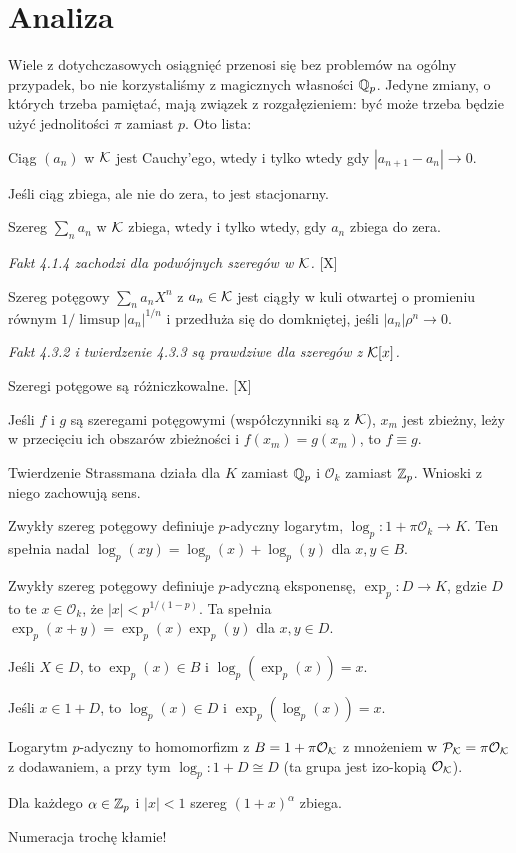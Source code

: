 \section{Analiza}
Wiele z dotychczasowych osiągnięć przenosi się bez problemów na ogólny przypadek, bo nie korzystaliśmy z magicznych własności $\mathbb Q_p$.
Jedyne zmiany, o których trzeba pamiętać, mają związek z rozgałęzieniem: być może trzeba będzie użyć jednolitości $\pi$ zamiast $p$. Oto lista:
\begin{enumx}
	\item Ciąg $(a_n)$ w $\mathcal K$ jest Cauchy'ego, wtedy i tylko wtedy gdy $|a_{n+1} - a_n| \to 0$.
	\item Jeśli ciąg zbiega, ale nie do zera, to jest stacjonarny.
	\item Szereg $\sum_n a_n$ w $\mathcal K$ zbiega, wtedy i tylko wtedy, gdy $a_n$ zbiega do zera.
	\item \emph{\color{black}Fakt 4.1.4 zachodzi dla podwójnych szeregów w $\mathcal K$.} [X]
	\item Szereg potęgowy $\sum_n  a_n X^n$ z $a_n \in \mathcal K$ jest ciągły w kuli otwartej o promieniu równym $1/\limsup |a_n|^{1/n}$ i przedłuża się do domkniętej, jeśli $|a_n| \rho^n \to 0$.
	\item \emph{\color{black} Fakt 4.3.2 i twierdzenie 4.3.3 są prawdziwe dla szeregów z $\mathcal K[x]$.}
	\item Szeregi potęgowe są różniczkowalne. [X]
	\item Jeśli $f$ i $g$ są szeregami potęgowymi (współczynniki są z $\mathcal K$), $x_m$ jest zbieżny, leży w przecięciu ich obszarów zbieżności i $f(x_m) = g(x_m)$, to $f \equiv g$.
	\item Twierdzenie Strassmana działa dla $K$ zamiast $\mathbb Q_p$ i $\mathcal O_k$ zamiast $\mathbb Z_p$.
	Wnioski z niego zachowują sens.
	\item Zwykły szereg potęgowy definiuje $p$-adyczny logarytm, $\log_p \colon 1 + \pi \mathcal O_k \to K$.
	Ten spełnia nadal $\log_p(xy) = \log_p(x) + \log_p(y)$ dla $x, y \in B$.
	\item Zwykły szereg potęgowy definiuje $p$-adyczną eksponensę, $\exp_p \colon D \to K$, gdzie $D$ to te $x \in \mathcal O_k$, że $|x| < p^{1/(1-p)}$.
	Ta spełnia $\exp_p(x+y) = \exp_p(x) \exp_p(y)$ dla $x, y \in D$.
	\item Jeśli $X \in D$, to $\exp_p(x) \in B$ i $\log_p(\exp_p(x)) = x$.
	\item Jeśli $x \in 1+D$, to $\log_p(x) \in D$ i $\exp_p(\log_p(x)) = x$.
	\item Logarytm $p$-adyczny to homomorfizm z $B=1+\pi \mathcal O_\mathcal K$ z mnożeniem w $\mathcal P_\mathcal K = \pi \mathcal O_\mathcal K$ z dodawaniem, a przy tym $\log_p \colon 1 + D \cong D$ (ta grupa jest izo-kopią $\mathcal O_{\mathcal K}$).
	\item Dla każdego $\alpha \in \mathbb Z_p$ i $|x| < 1$ szereg $(1+x)^\alpha$ zbiega.
	\item Numeracja trochę kłamie!
\end{enumx}
